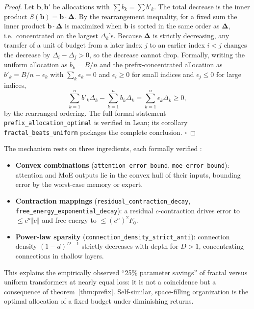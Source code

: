 \documentclass[journal]{IEEEtran}
\begin{document}
\begin{proof}
Let $\mathbf{b},\mathbf{b}'$ be allocations with $\sum b_k=\sum b'_k$. The total
decrease is the inner product $S(\mathbf{b})=\mathbf{b}\cdot\boldsymbol{\Delta}$.
By the rearrangement inequality, for a fixed sum the inner product
$\mathbf{b}\cdot\boldsymbol{\Delta}$ is maximized when $\mathbf{b}$ is sorted in
the same order as $\boldsymbol{\Delta}$, i.e.\ concentrated on the largest
$\Delta_k$'s. Because $\boldsymbol{\Delta}$ is strictly decreasing, any
transfer of a unit of budget from a later index $j$ to an earlier index $i<j$
changes the decrease by $\Delta_i-\Delta_j>0$, so the decrease cannot drop.
Formally, writing the uniform allocation as
$b_k=B/n$ and the prefix-concentrated allocation as
$b'_k=B/n + \epsilon_k$ with $\sum_k\epsilon_k=0$ and $\epsilon_i\ge0$ for small
indices and $\epsilon_j\le0$ for large indices,
\begin{equation}
\sum_{k=1}^n b'_k\Delta_k-\sum_{k=1}^n b_k\Delta_k
=\sum_{k=1}^n \epsilon_k\Delta_k \ge 0,
\label{eq:prefix}
\end{equation}
by the rearranged ordering. The full formal statement
\texttt{prefix\_allocation\_optimal} is verified in Lean; its corollary
\texttt{fractal\_beats\_uniform} packages the complete conclusion.
\hfill$\square$
\end{proof}

The mechanism rests on three ingredients, each formally verified
\cite{fractalnecessity}:
\begin{itemize}
\item \textbf{Convex combinations} (\texttt{attention\_error\_bound},
\texttt{moe\_error\_bound}): attention and MoE outputs lie in the convex hull of
their inputs, bounding error by the worst-case memory or expert.
\item \textbf{Contraction mappings} (\texttt{residual\_contraction\_decay},
\texttt{free\_energy\_exponential\_decay}): a residual $c$-contraction drives
error to $\le c^n\Vert e\Vert$ and free energy to $\le (c^n)^2 F_0$.
\item \textbf{Power-law sparsity} (\texttt{connection\_density\_strict\_anti}):
connection density $(1-d)^{D-1}$ strictly decreases with depth for $D>1$,
concentrating connections in shallow layers.
\end{itemize}

This explains the empirically observed ``25\% parameter savings'' of fractal
versus uniform transformers at nearly equal loss: it is not a coincidence but a
consequence of theorem~\ref{thm:prefix}. Self-similar, space-filling
organization is the optimal allocation of a fixed budget under diminishing
returns.
\end{document}
